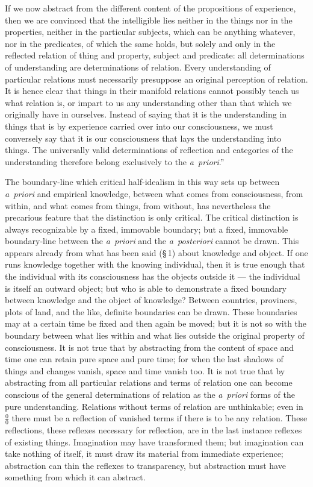 \documentclass[12pt]{book}
\begin{document}
If we now abstract from the different content of the propositions of
experience, then we are convinced that the intelligible lies neither in the
things nor in the properties, neither in the particular subjects, which can be
anything whatever, nor in the predicates, of which the same holds, but solely
and only in the reflected relation of thing and property, subject and
predicate: all determinations of understanding are determinations of relation.
Every understanding of particular relations must necessarily presuppose an
original perception of relation. It is hence clear that things in their
manifold relations cannot possibly teach us what relation is, or impart to us
any understanding other than that which we originally have in ourselves.
Instead of saying that it is the understanding in things that is by experience
carried over into our consciousness, we must conversely say that it is our
consciousness that lays the understanding into things. The universally valid
determinations of reflection and categories of the understanding therefore
belong exclusively to the \textit{a~priori}.''

The boundary-line which critical half-idealism in this way sets up between
\textit{a~priori} and empirical knowledge, between what comes from
consciousness, from within, and what comes from things, from without, has
nevertheless the precarious feature that the distinction is only critical.
The critical distinction is always recognizable by a fixed, immovable
boundary; but a fixed, immovable boundary-line between the \textit{a~priori}
and the \textit{a~posteriori} cannot be drawn. This appears already from what
has been said (\S\,1) about knowledge and object. If one runs knowledge
together with the knowing individual, then it is true enough that the
individual with its consciousness has the objects outside it --- the individual
is itself an outward object; but who is able to demonstrate a fixed boundary
between knowledge and the object of knowledge? Between countries, provinces,
plots of land, and the like, definite boundaries can be drawn. These
boundaries may at a certain time be fixed and then again be moved; but it is
not so with the boundary between what lies within and what lies outside the
original property of consciousness. It is not true that by abstracting from the
content of space and time one can retain pure space and pure time; for when the
last shadows of things and changes vanish, space and time vanish too. It is not
true that by abstracting from all particular relations and terms of relation
one can become conscious of the general determinations of relation as the
\textit{a~priori} forms of the pure understanding. Relations without terms of
relation are unthinkable; even in $\frac{0}{0}$ there must be a reflection of
vanished terms if there is to be any relation. These reflections, these
reflexes necessary for reflection, are in the last instance reflexes of
existing things. Imagination may have transformed them; but imagination can
take nothing of itself, it must draw its material from immediate experience;
abstraction can thin the reflexes to transparency, but abstraction must have
something from which it can abstract.
\end{document}
